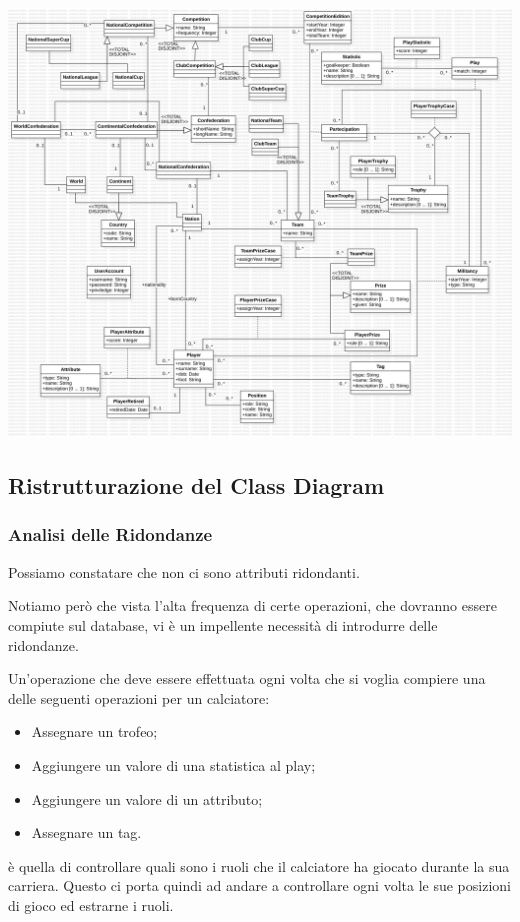 \includegraphics[width=\textwidth]{res/class_diagram_not_ristr}
\newpage

\subsection{Ristrutturazione del Class Diagram}

\subsubsection{Analisi delle Ridondanze}

Possiamo constatare che non ci sono attributi ridondanti.

Notiamo però che vista l'alta frequenza di certe operazioni, 
che dovranno essere compiute sul database, vi è
un impellente necessità di introdurre delle ridondanze.


Un'operazione che deve essere effettuata ogni volta che
si voglia compiere una delle seguenti operazioni
per un calciatore:
\begin{itemize}
	\item Assegnare un trofeo;
	\item Aggiungere un valore di una statistica
		al play;
	\item Aggiungere un valore di un attributo;
	\item Assegnare un tag.
\end{itemize}
è quella di controllare quali sono i ruoli
che il calciatore ha giocato durante la sua carriera.
Questo ci porta quindi ad andare a controllare ogni volta
le sue posizioni di gioco ed estrarne i ruoli.

